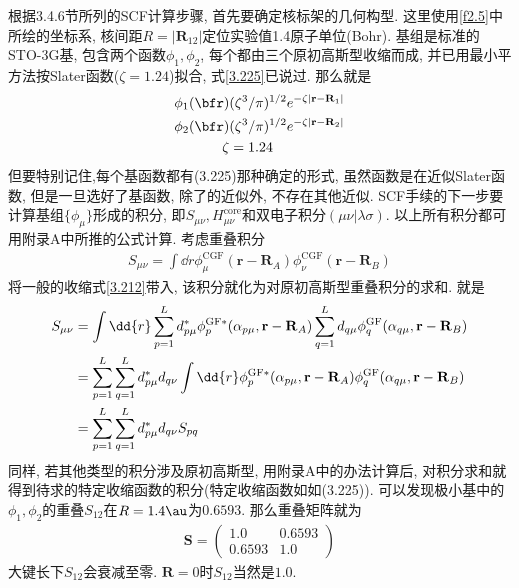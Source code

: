 根据3.4.6节所列的SCF计算步骤, 首先要确定核标架的几何构型. 这里使用\ref{f2.5}中所绘的坐标系, 核间距$R=|\mathbf{R}_{12}|$定位实验值1.4原子单位(Bohr). 基组是标准的STO-3G基, 包含两个函数$\phi_1,\phi_2$, 每个都由三个原初高斯型收缩而成, 并已用最小平方法按Slater函数($\zeta=1.24$)拟合, 式\eqref{3.225}已说过. 那么就是
\begin{equation}
\begin{split}
\phi_1(\bfr) & (\zeta^3/\pi)^{1/2}e^{-\zeta|\mathbf{r-R}_1|}\\
\phi_2(\bfr) & (\zeta^3/\pi)^{1/2}e^{-\zeta|\mathbf{r-R}_2|}\\
\zeta & = 1.24
\end{split}
\end{equation}
但要特别记住,每个基函数都有(3.225)那种确定的形式, 虽然函数是在近似Slater函数, 但是一旦选好了基函数, 除了\hft 的近似外, 不存在其他近似. SCF手续的下一步要计算基组$\{\phi_\mu\}$形成的积分, 即$S_{\mu\nu}, H_{\mu\nu}^\mathrm{core}$和双电子积分$(\mu\nu|\lambda\sigma)$. 以上所有积分都可用附录A中所推的公式计算. 考虑重叠积分
\begin{align}
S_{\mu\nu} = \int\dd{r}\phi_\mu^\mathrm{CGF}(\mathbf{r-R}_A)\phi_\nu^\mathrm{CGF}(\mathbf{r-R}_B)
\end{align}
将一般的收缩式\eqref{3.212}带入, 该积分就化为对原初高斯型重叠积分的求和. 就是
\begin{align}
S_{\mu\nu} & = \int\dd{r}\sum_{p=1}^{L}d_{p\mu}^*\phi_p^\mathrm{GF*}(\alpha_{p\mu},\mathbf{r-R}_A)\sum_{q=1}^{L}d_{q\mu}\phi_q^\mathrm{GF}(\alpha_{q\mu},\mathbf{r-R}_B)\notag\\
& = \sum_{p=1}^{L}\sum_{q=1}^{L} d_{p\mu}^*d_{q\nu}\int\dd{r}\phi_p^\mathrm{GF*}(\alpha_{p\mu},\mathbf{r-R}_A)\phi_q^\mathrm{GF}(\alpha_{q\mu},\mathbf{r-R}_B)\notag\\
& = \sum_{p=1}^{L}\sum_{q=1}^{L}d^*_{p\mu}d_{q\nu}S_{pq}
\end{align}
同样, 若其他类型的积分涉及原初高斯型, 用附录A中的办法计算后, 对积分求和就得到待求的特定收缩函数的积分(特定收缩函数如如(3.225)). 可以发现极小基中的$\phi_1,\phi_2$的重叠$S_{12}$在$R=1.4\au$为$0.6593$. 那么重叠矩阵就为
\begin{align}
\mathbf{S} = 
\begin{pmatrix}
1.0 & 0.6593\\0.6593 & 1.0
\end{pmatrix}
\end{align}
大键长下$S_{12}$会衰减至零. $\mathbf{R}=0$时$S_{12}$当然是$1.0$.

